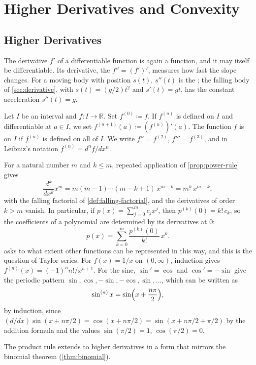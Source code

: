 \section{Higher Derivatives and Convexity}
\label{sec:convexity}

\subsection{Higher Derivatives}

The derivative $f'$ of a differentiable function is again a function, and it may itself be differentiable. Its derivative, the  $f''=(f')'$, measures how fast the slope changes. For a moving body with position $s(t)$, $s''(t)$ is the ; the falling body of \cref{sec:derivative}, with $s(t)=(g/2)t^2$ and $s'(t)=gt$, has the constant acceleration $s''(t)=g$.

\begin{definition}
\label{def:higher-derivative}
Let $I$ be an interval and $f\colon I\to\mathbb R$. Set $f^{(0)}\coloneqq f$. If $f^{(n)}$ is defined on $I$ and differentiable at $a\in I$, we set $f^{(n+1)}(a)\coloneqq(f^{(n)})'(a)$. The function $f$ is  on $I$ if $f^{(n)}$ is defined on all of $I$. We write $f''=f^{(2)}$, $f'''=f^{(3)}$, and in Leibniz's notation $f^{(n)}=d^nf/dx^n$.
\end{definition}

For a natural number $m$ and $k\le m$, repeated application of \cref{prop:power-rule} gives
\[
\frac{d^k}{dx^k}x^m=m(m-1)\cdots(m-k+1)\,x^{m-k}=m^{\underline k}\,x^{m-k},
\]
with the falling factorial of \cref{def:falling-factorial}, and the derivatives of order $k>m$ vanish. In particular, if $p(x)=\sum_{j=0}^mc_jx^j$, then $p^{(k)}(0)=k!\,c_k$, so the coefficients of a polynomial are determined by its derivatives at $0$:
\[
p(x)=\sum_{k=0}^m\frac{p^{(k)}(0)}{k!}\,x^k .
\]
 asks to what extent other functions can be represented in this way, and this is the question of Taylor series. For $f(x)=1/x$ on $(0,\infty)$, induction gives $f^{(n)}(x)=(-1)^nn!/x^{n+1}$. For the sine, $\sin'=\cos$ and $\cos'=-\sin$ give the periodic pattern $\sin,\cos,-\sin,-\cos,\sin,\ldots$, which can be written as
\[
\sin^{(n)}x=\sin\Bigl(x+\frac{n\pi}2\Bigr),
\]
by induction, since $(d/dx)\sin(x+n\pi/2)=\cos(x+n\pi/2)=\sin(x+n\pi/2+\pi/2)$ by the addition formula and the values $\sin(\pi/2)=1$, $\cos(\pi/2)=0$.

The product rule extends to higher derivatives in a form that mirrors the binomial theorem (\cref{thm:binomial}).

